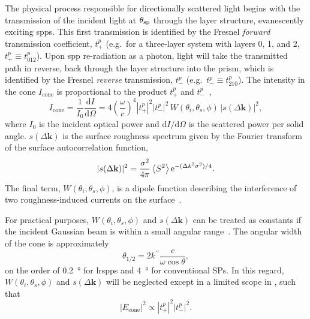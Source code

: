 The physical process responsible for directionally scattered light begins
with the transmission of the incident light at $\theta_\mathrm{sp}$ through the layer
structure, evanescently exciting \glspl{spp}.  This first transmission is
identified by the Fresnel \textit{forward} transmission coefficient,
$t^p_+$ (e.g.\ for a three-layer system with layers 0, 1, and 2, $t^p_+
\equiv t^p_{012}$).  Upon \gls{spp} re-radiation as a photon, light will take the
transmitted path in reverse, back through the layer structure into the
prism, which is identified by the Fresnel \textit{reverse} transmission,
$t^p_-$ (e.g.\  $t^p_- \equiv t^p_{210}$).  The intensity in the cone
$I_\mathrm{cone}$ is proportional to the product $t^p_+$ and $t^p_-$~\cite{simon1976directional},
\begin{equation}
  I_\mathrm{cone}
  = \frac{1}{I_0}\frac{\mathrm{d}I}{\mathrm{d}\Omega}
  = 4 {\left(\frac{\omega}{c}\right)}^4 |t^p_+|^2
  |t^p_-|^2\,W(\theta_i,\theta_s,\phi)\, |s(\Delta \mathbf{k})|^2
  \label{eqn:guhacone},
\end{equation}
where $I_0$ is the incident optical power and
$\mathrm{d}I/\mathrm{d}\Omega$ is the scattered power per solid angle.
$s(\Delta \mathbf{k})$ is the surface roughness spectrum given by the Fourier
transform of the surface autocorrelation function,
\begin{equation}
  |s(\Delta \mathbf{k})|^2 = \frac{\sigma^2}{4\pi} \left<S^2\right>
  {\mathrm{e}}^{-(\Delta k^2 \sigma^2)/4}.
  \label{eqn:surfaceroughness}
\end{equation}
The final term, $W(\theta_i,\theta_s,\phi)$, is a dipole function describing
the interference of two roughness-induced currents on the
surface~\cite{raether1997surface}.

For practical purposes, $W(\theta_i,\theta_s,\phi)$ and $s(\Delta
\mathbf{k})$ can be treated as constants if the incident Gaussian beam is
within a small angular range~\cite{heitmann1977determination}.  The angular
width of the cone is approximately
\begin{equation}
  \theta_{1/2} = 2 k^{\prime\prime} \frac{c}{\omega \cos \theta},
\end{equation}
on the order of \SI{0.2}{\degree} for \glspl{lrspp} and \SI{4}{\degree} for
conventional SPs.  In this regard, $W(\theta_i,\theta_s,\phi)$ and
$s(\Delta \mathbf{k})$ will be neglected
except in a limited scope in , such that
\begin{equation}
  |E_\mathrm{cone}|^2 \propto |t^p_+|^2 |t^p_-|^2.
  \label{eqn:conefield}
\end{equation}


